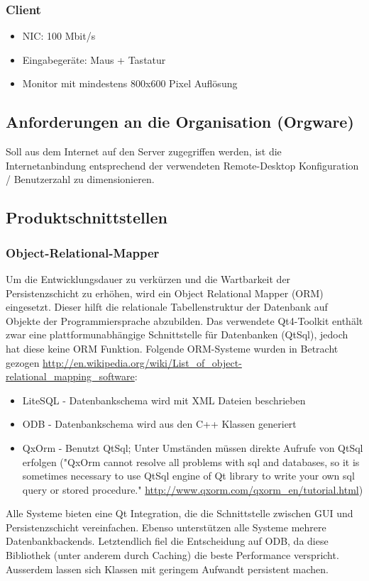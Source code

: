 \documentclass[a4paper,10pt]{article}
\begin{document}
\subsubsection{Client}
\begin{itemize}
	\item NIC: 100 Mbit/s
	\item Eingabegeräte: Maus + Tastatur
	\item Monitor mit mindestens 800x600 Pixel Auflösung
\end{itemize}
\subsection{Anforderungen an die Organisation (Orgware)}
Soll aus dem Internet auf den Server zugegriffen werden, ist die Internetanbindung entsprechend der verwendeten Remote-Desktop Konfiguration / Benutzerzahl zu dimensionieren.
\subsection{Produktschnittstellen}
\subsubsection{Object-Relational-Mapper}
Um die Entwicklungsdauer zu verkürzen und die Wartbarkeit der Persistenzschicht zu erhöhen, wird ein Object Relational Mapper (ORM) eingesetzt. 
Dieser hilft die relationale Tabellenstruktur der Datenbank auf Objekte der Programmiersprache abzubilden.
Das verwendete Qt4-Toolkit enthält zwar eine plattformunabhängige Schnittstelle für Datenbanken (QtSql), jedoch hat diese keine ORM Funktion.
Folgende ORM-Systeme wurden in Betracht gezogen \newline\url{http://en.wikipedia.org/wiki/List_of_object-relational_mapping_software}:
\begin{itemize}
	\item LiteSQL - Datenbankschema wird mit XML Dateien beschrieben
	\item ODB - Datenbankschema wird aus den C++ Klassen generiert
	\item QxOrm - Benutzt QtSql; Unter Umständen müssen direkte Aufrufe von QtSql erfolgen
	("QxOrm cannot resolve all problems with sql and databases, so it is sometimes necessary to use QtSql engine of Qt library to write your own sql query or stored procedure." \url{http://www.qxorm.com/qxorm_en/tutorial.html})
\end{itemize}
Alle Systeme bieten eine Qt Integration, die die Schnittstelle zwischen GUI und Persistenzschicht vereinfachen.
Ebenso unterstützen alle Systeme mehrere Datenbankbackends.
Letztendlich fiel die Entscheidung auf ODB, da diese Bibliothek (unter anderem durch Caching) die beste Performance verspricht.
Ausserdem lassen sich Klassen mit geringem Aufwandt persistent machen.
\end{document}
